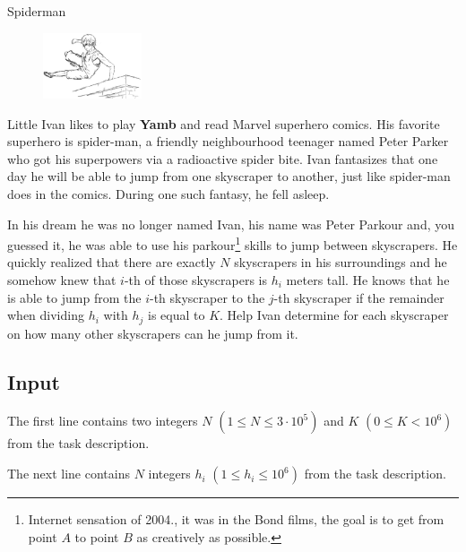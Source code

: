 \begin{statement}[
  problempoints=70,
  timelimit=1 second,
  memorylimit=512 MiB,
]{Spiderman}

\setlength\intextsep{-0.1cm}
\begin{figure}
\centering
\includegraphics[width=0.26\textwidth]{img/spiderman.png}
\end{figure}

Little Ivan likes to play \textbf{Yamb} and read Marvel superhero comics.
His favorite superhero is spider-man, a friendly neighbourhood teenager
named Peter Parker who got his superpowers via a radioactive spider bite.
Ivan fantasizes that one day he will be able to jump from one skyscraper to
another, just like spider-man does in the comics. During one such fantasy, he
fell asleep.

In his dream he was no longer named Ivan, his name was Peter Parkour and, you
guessed it, he was able to use his parkour\footnote{Internet
sensation of 2004., it was in the Bond films, the goal is to get from
point $A$ to point $B$ as creatively as possible.} skills to jump between
skyscrapers. He quickly realized that there are exactly $N$ skyscrapers in
his surroundings and he somehow knew that $i$-th of those skyscrapers is
$h_i$ meters tall. He knows that he is able to jump from the $i$-th skyscraper
to the $j$-th skyscraper if the remainder when dividing $h_i$ with $h_j$ is
equal to $K$. Help Ivan determine for each skyscraper on how many other
skyscrapers can he jump from it.

\subsection*{Input}
The first line contains two integers $N$ $(1 \le N \le 3\cdot10^5)$ and $K$
$(0 \le K < 10^6)$ from the task description.

The next line contains $N$ integers $h_i$ $(1 \le h_i \le 10^6)$ from the task
description.


\end{statement}
